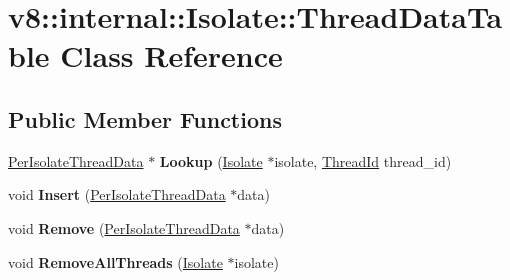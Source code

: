 \hypertarget{classv8_1_1internal_1_1_isolate_1_1_thread_data_table}{}\section{v8\+:\+:internal\+:\+:Isolate\+:\+:Thread\+Data\+Table Class Reference}
\label{classv8_1_1internal_1_1_isolate_1_1_thread_data_table}
\subsection*{Public Member Functions}
\begin{DoxyCompactItemize}
\item 
\hyperlink{classv8_1_1internal_1_1_isolate_1_1_per_isolate_thread_data}{Per\+Isolate\+Thread\+Data} $\ast$ {\bfseries Lookup} (\hyperlink{classv8_1_1internal_1_1_isolate}{Isolate} $\ast$isolate, \hyperlink{classv8_1_1internal_1_1_thread_id}{Thread\+Id} thread\+\_\+id)\hypertarget{classv8_1_1internal_1_1_isolate_1_1_thread_data_table_a18dd8e7e913389c25c7f6e32b7d4c0ce}{}\label{classv8_1_1internal_1_1_isolate_1_1_thread_data_table_a18dd8e7e913389c25c7f6e32b7d4c0ce}

\item 
void {\bfseries Insert} (\hyperlink{classv8_1_1internal_1_1_isolate_1_1_per_isolate_thread_data}{Per\+Isolate\+Thread\+Data} $\ast$data)\hypertarget{classv8_1_1internal_1_1_isolate_1_1_thread_data_table_ac31197a67a116cdaa3e87b8e448dc661}{}\label{classv8_1_1internal_1_1_isolate_1_1_thread_data_table_ac31197a67a116cdaa3e87b8e448dc661}

\item 
void {\bfseries Remove} (\hyperlink{classv8_1_1internal_1_1_isolate_1_1_per_isolate_thread_data}{Per\+Isolate\+Thread\+Data} $\ast$data)\hypertarget{classv8_1_1internal_1_1_isolate_1_1_thread_data_table_a217f61039e5eb5e71720195dfc2128bf}{}\label{classv8_1_1internal_1_1_isolate_1_1_thread_data_table_a217f61039e5eb5e71720195dfc2128bf}

\item 
void {\bfseries Remove\+All\+Threads} (\hyperlink{classv8_1_1internal_1_1_isolate}{Isolate} $\ast$isolate)\hypertarget{classv8_1_1internal_1_1_isolate_1_1_thread_data_table_af9b5e5051578d0747f861f37538352f6}{}\label{classv8_1_1internal_1_1_isolate_1_1_thread_data_table_af9b5e5051578d0747f861f37538352f6}

\end{DoxyCompactItemize}
